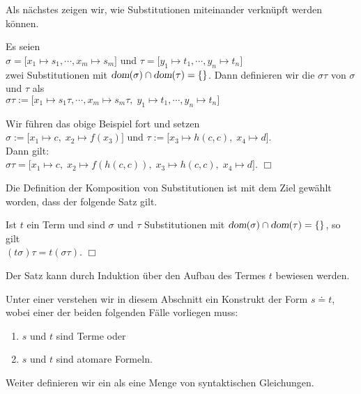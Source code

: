 \noindent
Als nächstes zeigen wir, wie  Substitutionen miteinander verknüpft werden können.
\begin{Definition} 
    Es seien\\[0.2cm]
    \hspace*{1.3cm}  $\sigma = \big[ x_1 \mapsto s_1, \cdots, x_m \mapsto s_m \big]$ \quad und \quad  $\tau = \big[ y_1 \mapsto t_1, \cdots, y_n \mapsto t_n \big]$ \\[0.2cm]
    zwei Substitutionen mit $\textsl{dom}(\sigma) \cap \textsl{dom}(\tau) = \{\}$. Dann definieren
    wir die  $\sigma\tau$ von $\sigma$ und $\tau$ als \\[0.2cm]
    \hspace*{1.3cm} $\sigma\tau := \big[ x_1 \mapsto s_1\tau, \cdots, x_m \mapsto s_m\tau,\; y_1 \mapsto t_1, \cdots, y_n \mapsto t_n \big]$
    \eox
\end{Definition}

\example
Wir führen das obige Beispiel fort und setzen \\[0.2cm]
\hspace*{1.3cm} $\sigma := \big[ x_1 \mapsto c,\; x_2 \mapsto f(x_3) \big]$
                \quad und \quad $\tau := \big[ x_3 \mapsto h(c,c),\; x_4 \mapsto d \big]$. \\[0.2cm]
Dann gilt: \\[0.2cm]
\hspace*{1.3cm} $ \sigma\tau = \big[ x_1 \mapsto c,\; x_2 \mapsto f(h(c,c)),\; x_3 \mapsto h(c,c),\;x_4 \mapsto d \big]$.
\hspace*{\fill} $\Box$
\vspace{0.3cm}

\noindent
Die Definition der Komposition von Substitutionen ist mit dem Ziel gewählt worden, dass
der folgende Satz gilt.
\begin{Satz} \label{satz:komposition}
    Ist $t$ ein Term und sind $\sigma$ und $\tau$ Substitutionen mit 
    $\textsl{dom}(\sigma) \cap \textsl{dom}(\tau) = \{\}$, so gilt \\[0.2cm]
    \hspace*{1.3cm} $(t \sigma)\tau = t (\sigma\tau)$.
    \hspace*{\fill} $\Box$
\end{Satz}
Der Satz kann durch Induktion über den Aufbau des Termes $t$ bewiesen werden.


\begin{Definition}
Unter einer  verstehen wir in diesem Abschnitt ein Konstrukt der Form
$s \doteq t$, wobei einer der beiden folgenden Fälle vorliegen muss:
\begin{enumerate}
\item $s$ und $t$ sind Terme  oder
\item $s$ und $t$ sind atomare Formeln.
\end{enumerate}
Weiter definieren wir ein  als eine Menge
von syntaktischen Gleichungen.
\eox
\end{Definition}

